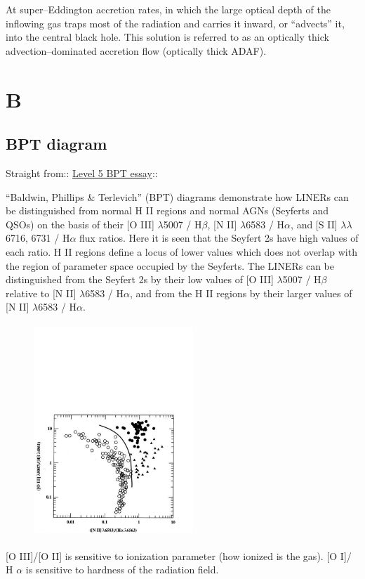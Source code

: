 \documentclass[11pt]{article}
\begin{document}
At super–Eddington accretion rates, in which the large optical depth
of the inflowing gas traps most of the radiation and carries it
inward, or “advects” it, into the central black hole. This solution is
referred to as an optically thick advection–dominated accretion flow
(optically thick ADAF).

\section*{B}
\subsection*{BPT diagram}
Straight from:: \href{http://ned.ipac.caltech.edu/level5/Glossary/Essay_bpt.html}{Level 5 BPT essay}::

``Baldwin, Phillips \& Terlevich'' (BPT) diagrams demonstrate how LINERs can be distinguished from normal H II regions and normal AGNs (Seyferts and QSOs) on the basis of their [O III] $\lambda$5007 / H$\beta$, [N II] $\lambda$6583 / H$\alpha$, and [S II] $\lambda \lambda$6716, 6731 / H$\alpha$ flux ratios. Here it is seen that the Seyfert 2s have high values of each ratio. H II regions define a locus of lower values which does not overlap with the region of parameter space occupied by the Seyferts. The LINERs can be distinguished from the Seyfert 2s by their low values of [O III] $\lambda$5007 / H$\beta$ relative to [N II] $\lambda$6583 / H$\alpha$, and from the H II regions by their larger values of [N II] $\lambda$6583 / H$\alpha$. 

\begin{figure}
  \includegraphics[height=8.0cm,width=6.0cm]
  {BPT.pdf}
  \caption[]{}
\end{figure}
[O III]/[O II] is sensitive to ionization parameter (how ionized is the gas).
[O I]/ H $\alpha$ is sensitive to hardness of the radiation field. 
\end{document}
